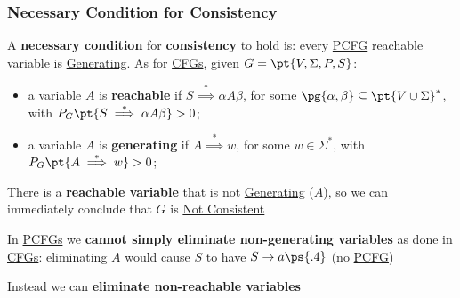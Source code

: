 \subsubsection{Necessary Condition for Consistency}\label{sub:lm_necessary_condition_for_consistency} %
A \textbf{necessary condition} for \textbf{consistency} to hold is: every \hyperref[def:pcfg]{PCFG} reachable variable is \hyperref[def:simb-generante]{Generating}.
As for \hyperref[def:cfg]{CFGs}, given $G = \pt{V,\Sigma,P,S}$:
\begin{itemize}
    \item a variable $A$ is \textbf{reachable} if $S \overset{*}{\implies}\alpha A\beta$, for some $\pg{\alpha,\beta} \subseteq \pt{V\cup \Sigma}^*$, with $P_G \pt{S \overset{*}{\implies}\alpha A\beta}> 0$;
    \item a variable $A$ is \textbf{generating} if $A \overset{*}{\implies}w$, for some $w \in \Sigma^*$, with $P_G \pt{A \overset{*}{\implies}w}> 0$;
\end{itemize}
\begin{note}
    There is a \textbf{reachable variable} that is not \hyperref[def:simb-generante]{Generating} ($A$), so we can immediately conclude that $G$ is \hyperref[def:pg-consistent]{Not Consistent}
    \begin{warning}
        In \hyperref[def:pcfg]{PCFGs} we \textbf{cannot simply eliminate non-generating variables} as done in \hyperref[def:cfg]{CFGs}: eliminating $A$ would cause $S$ to have $S\to a \ps{.4}$ (no \hyperref[def:pcfg]{PCFG})
    \end{warning}
    \begin{note}
        Instead we can \textbf{eliminate non-reachable variables}
    \end{note}
\end{note}

